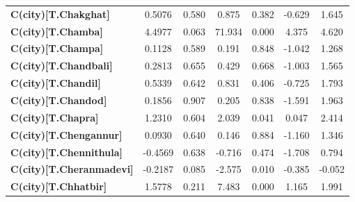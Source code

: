 \begin{center}
\begin{tabular}{lcccccc}
\textbf{C(city)[T.Chakghat]}                                                                        &       0.5076  &        0.580     &     0.875  &         0.382        &       -0.629    &        1.645     \\
\textbf{C(city)[T.Chamba]}                                                                          &       4.4977  &        0.063     &    71.934  &         0.000        &        4.375    &        4.620     \\
\textbf{C(city)[T.Champa]}                                                                          &       0.1128  &        0.589     &     0.191  &         0.848        &       -1.042    &        1.268     \\
\textbf{C(city)[T.Chandbali]}                                                                       &       0.2813  &        0.655     &     0.429  &         0.668        &       -1.003    &        1.565     \\
\textbf{C(city)[T.Chandil]}                                                                         &       0.5339  &        0.642     &     0.831  &         0.406        &       -0.725    &        1.793     \\
\textbf{C(city)[T.Chandod]}                                                                         &       0.1856  &        0.907     &     0.205  &         0.838        &       -1.591    &        1.963     \\
\textbf{C(city)[T.Chapra]}                                                                          &       1.2310  &        0.604     &     2.039  &         0.041        &        0.047    &        2.414     \\
\textbf{C(city)[T.Chengannur]}                                                                      &       0.0930  &        0.640     &     0.146  &         0.884        &       -1.160    &        1.346     \\
\textbf{C(city)[T.Chennithula]}                                                                     &      -0.4569  &        0.638     &    -0.716  &         0.474        &       -1.708    &        0.794     \\
\textbf{C(city)[T.Cheranmadevi]}                                                                    &      -0.2187  &        0.085     &    -2.575  &         0.010        &       -0.385    &       -0.052     \\
\textbf{C(city)[T.Chhatbir]}                                                                        &       1.5778  &        0.211     &     7.483  &         0.000        &        1.165    &        1.991     \\

\end{tabular}
\end{center}
